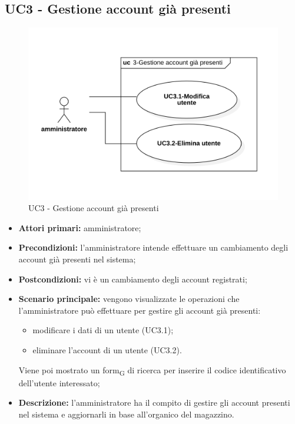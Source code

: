 \subsection{UC3 - Gestione account già presenti}
\begin{figure}[H]
	\centering
	\includegraphics[scale=0.52]{res/images/uc3.png}
	\caption{UC3 - Gestione account già presenti}
\end{figure}

\begin{itemize}
	\item 	\textbf{Attori primari:} amministratore;
	\item 	\textbf{Precondizioni:} l'amministratore intende effettuare un cambiamento degli account già presenti nel sistema;
	\item 	\textbf{Postcondizioni:} vi è un cambiamento degli account registrati;
	\item 	\textbf{Scenario principale:} vengono visualizzate le operazioni che l'amministratore può effettuare per gestire gli account già presenti:
	\begin{itemize}
		\item modificare i dati di un utente (UC3.1);
		\item eliminare l'account di un utente (UC3.2).
	\end{itemize}
	Viene poi mostrato un form\textsubscript{G} di ricerca per inserire il codice identificativo dell'utente interessato;
	\item 	\textbf{Descrizione:} l'amministratore ha il compito di gestire gli account presenti nel sistema e aggiornarli in base all'organico del magazzino.
\end{itemize}

